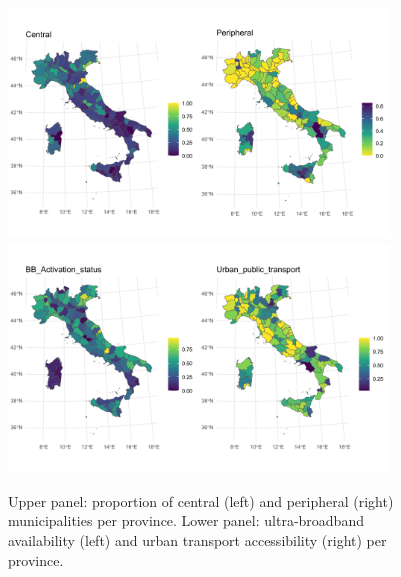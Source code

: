 \documentclass[openany]{book}
\begin{document}
%
\begin{figure}[htbp]
    \centering
    \includegraphics[width=0.9\textwidth]{Invalsi/X_prov_1.pdf} \\%
    \includegraphics[width=0.9\textwidth]{Invalsi/X_prov_2.pdf} 
    \caption{Upper panel: proportion of central (left) and peripheral (right) municipalities per province.
    Lower panel: ultra-broadband availability (left) and urban transport accessibility (right) per province.}
    \label{fig:Xprov}
\end{figure}
%
\end{document}
